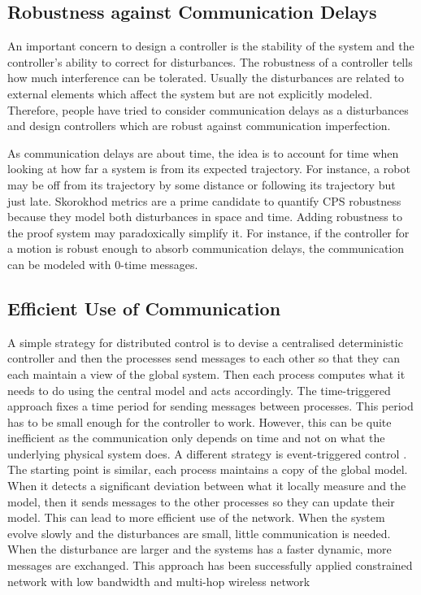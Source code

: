 \documentclass[
graybox,
envcountchap
]{svmult}
\begin{document}
\begin{bibunit}
    \subsection{Robustness against Communication Delays}

    An important concern to design a controller is the stability of the system and the controller's ability to correct for disturbances.
    The robustness of a controller tells how much interference can be tolerated.
    Usually the disturbances are related to external elements which affect the system but are not explicitly modeled.
    Therefore, people have tried to consider communication delays as a disturbances and design controllers which are robust against communication imperfection.

    As communication delays are about time, the idea is to account for time when looking at how far a system is from its expected trajectory.
    For instance, a robot may be off from its trajectory by some distance or following its trajectory but just late.
    Skorokhod metrics \cite{DBLP:conf/cav/DeshmukhMP15,DBLP:conf/hybrid/MajumdarP15,DBLP:conf/cyphy/KidoSH17,DBLP:conf/adhs/KidoSH18} are a prime candidate to quantify CPS robustness because they model both disturbances in space and time.
    Adding robustness to the proof system may paradoxically simplify it.
    For instance, if the controller for a motion is robust enough to absorb communication delays, the communication can be modeled with 0-time messages.

    \subsection{Efficient Use of Communication}

   A simple strategy for distributed control is to devise a centralised deterministic controller and then the processes send messages to each other so that they can each maintain a view of the global system.
    Then each process computes what it needs to do using the central model and acts accordingly.
    The time-triggered approach fixes a time period for sending messages between processes.
    This period has to be small enough for the controller to work.
    However, this can be quite inefficient as the communication only depends on time and not on what the underlying physical system does.
    A different strategy is event-triggered control \cite{Lemmon2010}.
    The starting point is similar, each process maintains a copy of the global model.
    When it detects a significant deviation between what it locally measure and the model, then it sends messages to the other processes so they can update their model.
    This can lead to more efficient use of the network.
    When the system evolve slowly and the disturbances are small, little communication is needed.
    When the disturbance are larger and the systems has a faster dynamic, more messages are exchanged.
    This approach has been successfully applied constrained network with low bandwidth \cite{DBLP:conf/icra/TrimpeB15} and multi-hop wireless network \cite{DBLP:journals/csysl/BaumannMZT20}



\end{bibunit}
\end{document}
